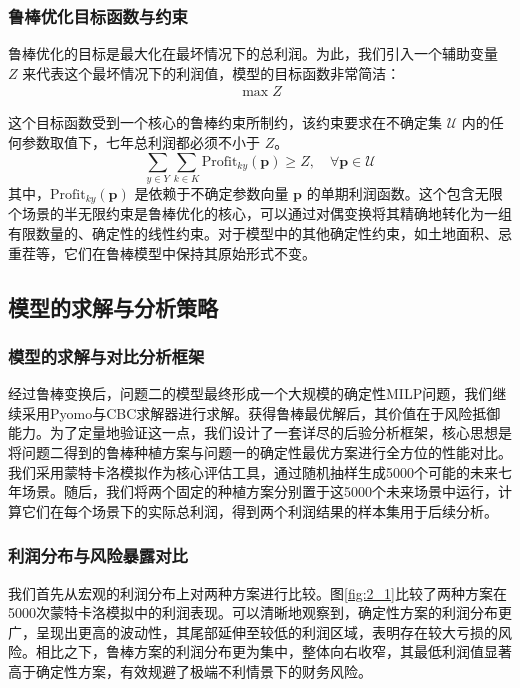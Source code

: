 \documentclass[withoutpreface,bwprint]{cumcmthesis} %
\begin{document}
\subsubsection{鲁棒优化目标函数与约束}

鲁棒优化的目标是最大化在最坏情况下的总利润。为此，我们引入一个辅助变量 $Z$ 来代表这个最坏情况下的利润值，模型的目标函数非常简洁：
\begin{align}
	\max Z
\end{align}

这个目标函数受到一个核心的鲁棒约束所制约，该约束要求在不确定集 $\mathcal{U}$ 内的任何参数取值下，七年总利润都必须不小于 $Z$。
\begin{equation}
	\sum_{y \in Y} \sum_{k \in K} \text{Profit}_{ky}(\mathbf{p}) \ge Z, \quad \forall \mathbf{p} \in \mathcal{U}
\end{equation}
其中，$\text{Profit}_{ky}(\mathbf{p})$ 是依赖于不确定参数向量 $\mathbf{p}$ 的单期利润函数。这个包含无限个场景的半无限约束是鲁棒优化的核心，可以通过对偶变换将其精确地转化为一组有限数量的、确定性的线性约束。对于模型中的其他确定性约束，如土地面积、忌重茬等，它们在鲁棒模型中保持其原始形式不变。

\subsection{模型的求解与分析策略}

\subsubsection{模型的求解与对比分析框架}

经过鲁棒变换后，问题二的模型最终形成一个大规模的确定性MILP问题，我们继续采用Pyomo与CBC求解器进行求解。获得鲁棒最优解后，其价值在于风险抵御能力。为了定量地验证这一点，我们设计了一套详尽的后验分析框架，核心思想是将问题二得到的鲁棒种植方案与问题一的确定性最优方案进行全方位的性能对比。我们采用蒙特卡洛模拟作为核心评估工具，通过随机抽样生成5000个可能的未来七年场景。随后，我们将两个固定的种植方案分别置于这5000个未来场景中运行，计算它们在每个场景下的实际总利润，得到两个利润结果的样本集用于后续分析。

\subsubsection{利润分布与风险暴露对比}

我们首先从宏观的利润分布上对两种方案进行比较。图\ref{fig:2_1}比较了两种方案在5000次蒙特卡洛模拟中的利润表现。可以清晰地观察到，确定性方案的利润分布更广，呈现出更高的波动性，其尾部延伸至较低的利润区域，表明存在较大亏损的风险。相比之下，鲁棒方案的利润分布更为集中，整体向右收窄，其最低利润值显著高于确定性方案，有效规避了极端不利情景下的财务风险。
\end{document}
